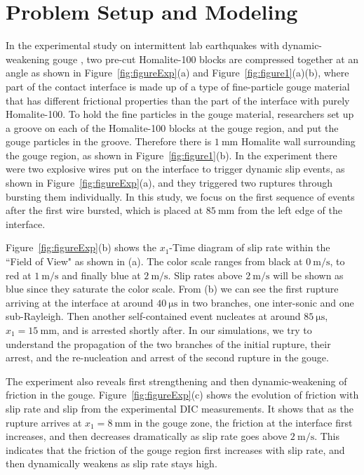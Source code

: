\documentclass[final,a4paper]{elsarticle}
\begin{document}
\section{Problem Setup and Modeling}
\label{sec:problem}
In the experimental study on intermittent lab earthquakes with dynamic-weakening gouge \cite{Rubino2022},  
two pre-cut Homalite-100 blocks are compressed together at an angle as shown in Figure~\ref{fig:figureExp}(a) and Figure~\ref{fig:figure1}(a)(b), 
where part of the contact interface is made up of a type of fine-particle gouge material that has different frictional properties than the part of the interface with purely Homalite-100. 
To hold the fine particles in the gouge material, 
researchers set up a groove on each of the Homalite-100 blocks at the gouge region,
and put the gouge particles in the groove.
Therefore there is $1\ \mathrm{mm}$ Homalite wall surrounding the gouge region, 
as shown in Figure~\ref{fig:figure1}(b). 
In the experiment there were two explosive wires put on the interface to trigger dynamic slip events, 
as shown in Figure~\ref{fig:figureExp}(a), 
and they triggered two ruptures through bursting them individually. 
In this study, 
we focus on the first sequence of events after the first wire bursted, 
which is placed at $85\ \mathrm{mm}$ from the left edge of the interface. 

Figure~\ref{fig:figureExp}(b) shows the $x_1$-Time diagram of slip rate within the ``Field of View" as shown in (a). 
The color scale ranges from black at $0\ \mathrm{m/s}$, 
to red at $1\ \mathrm{m/s}$ and finally blue at $2\ \mathrm{m/s}$. 
Slip rates above $2\ \mathrm{m/s}$ will be shown as blue since they saturate the color scale. 
From (b) we can see the first rupture arriving at the interface at around $40\ \mathrm{\mu s}$ in two branches, 
one inter-sonic and one sub-Rayleigh. 
Then another self-contained event nucleates at around $85\ \mathrm{\mu s}$, $x_1 = 15\ \mathrm{mm}$, 
and is arrested shortly after. 
In our simulations, 
we try to understand the propagation of the two branches of the initial rupture, 
their arrest, 
and the re-nucleation and arrest of the second rupture in the gouge. 

The experiment also reveals first strengthening and then dynamic-weakening of friction in the gouge. 
Figure~\ref{fig:figureExp}(c) shows the evolution of friction with slip rate and slip from the experimental DIC measurements. 
It shows that as the rupture arrives at $x_1 = 8\ \mathrm{mm}$ in the gouge zone, 
the friction at the interface first increases, 
and then decreases dramatically as slip rate goes above $2\ \mathrm{m/s}$. 
This indicates that the friction of the gouge region first increases with slip rate, 
and then dynamically weakens as slip rate stays high. 
\end{document}
